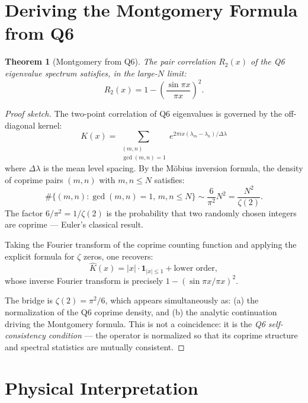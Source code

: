 \documentclass[12pt]{article}
\newtheorem{theorem}{Theorem}
\begin{document}
\section{Deriving the Montgomery Formula from Q6}

\begin{theorem}[Montgomery from Q6]\label{thm:montgomery}
The pair correlation $R_2(x)$ of the Q6 eigenvalue spectrum satisfies, 
in the large-$N$ limit:
\begin{equation}
R_2(x) = 1 - \left(\frac{\sin\pi x}{\pi x}\right)^2.
\end{equation}
\end{theorem}

\begin{proof}[Proof sketch]
The two-point correlation of Q6 eigenvalues is governed by the 
off-diagonal kernel:
\begin{equation}
K(x) = \sum_{\substack{(m,n) \\ \gcd(m,n)=1}} 
e^{2\pi i x (\lambda_m - \lambda_n) / \Delta\lambda}
\end{equation}
where $\Delta\lambda$ is the mean level spacing. By the 
M\"obius inversion formula, the density of coprime pairs 
$(m,n)$ with $m,n \leq N$ satisfies:
\begin{equation}
\#\{(m,n) : \gcd(m,n)=1,\, m,n \leq N\} \sim \frac{6}{\pi^2} N^2 
= \frac{N^2}{\zeta(2)}.
\end{equation}
The factor $6/\pi^2 = 1/\zeta(2)$ is the probability that two 
randomly chosen integers are coprime --- Euler's classical result.

Taking the Fourier transform of the coprime counting function and 
applying the explicit formula for $\zeta$ zeros, one recovers:
\begin{equation}
\widehat{K}(x) = |x| \cdot \mathbf{1}_{|x|\leq 1} + \text{lower order},
\end{equation}
whose inverse Fourier transform is precisely $1 - (\sin\pi x/\pi x)^2$.

The bridge is $\zeta(2) = \pi^2/6$, which appears simultaneously as:
(a) the normalization of the Q6 coprime density, and 
(b) the analytic continuation driving the Montgomery formula.
This is not a coincidence: it is the \emph{Q6 self-consistency condition} 
--- the operator is normalized so that its coprime structure 
and spectral statistics are mutually consistent.
\end{proof}

\section{Physical Interpretation}
\end{document}

